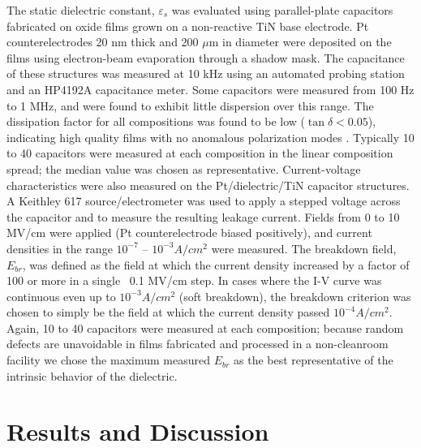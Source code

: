 The static dielectric constant, $\varepsilon_s$ was evaluated using parallel-plate capacitors fabricated on oxide films grown on a non-reactive TiN base electrode.  Pt counterelectrodes 20 nm thick and 200 $\mu$m in diameter were deposited on the films using electron-beam evaporation through a shadow mask.  
The capacitance of these structures was measured at 10 kHz using an automated probing station and an HP4192A capacitance meter.  Some capacitors were measured from 100 Hz to 1 MHz, and were found to exhibit little dispersion over this range. The dissipation factor for all compositions was found to be low ($\tan\delta < 0.05$), indicating high quality films with no anomalous polarization modes \cite{Barron2009}.
Typically 10 to 40  capacitors were measured at each composition in the linear composition spread; the median value was chosen as representative.
Current-voltage characteristics were also measured on the Pt/dielectric/TiN capacitor structures. 
A Keithley 617 source/electrometer was used to apply a stepped voltage across the capacitor and to measure the resulting leakage current. 
Fields from 0 to 10  MV/cm were applied (Pt counterelectrode biased positively), and current densities in the range $10^{-7}$ -- $10^{-3} A/cm^{2}$ were measured.  The breakdown field, $E_{br}$, was defined as the field at which the current density increased by a factor of 100 or more in a single ~0.1 MV/cm step. 
In cases where the I-V curve was continuous even up to $10^{-3} A/cm^2$ (soft breakdown), the breakdown criterion was chosen to simply be the field at which the current density passed $10^{-4} A/cm^2$. 
Again, 10 to 40 capacitors were measured at each composition; because random defects are unavoidable in films fabricated and processed in a non-cleanroom facility we chose the maximum measured $E_{br}$ as the best representative of the intrinsic behavior of the dielectric.

\section{Results and Discussion}
